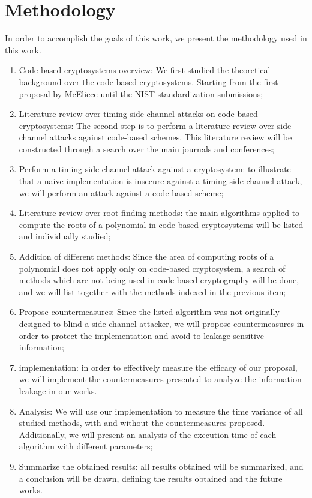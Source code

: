 \section{Methodology}
In order to accomplish the goals of this work, we present the methodology used in this work.
\begin{enumerate}
    \item Code-based cryptosystems overview: We first studied the theoretical background over the code-based cryptosystems. Starting from the first proposal by McEliece until the NIST standardization submissions;
    \item Literature review over timing side-channel attacks on code-based cryptosystems: The second step is to perform a literature review over side-channel attacks against code-based schemes. This literature review will be constructed through a search over the main journals and conferences;
    \item Perform a timing side-channel attack against a cryptosystem: to illustrate that a naive implementation is insecure against a timing side-channel attack, we will perform an attack against a code-based scheme;
    \item Literature review over root-finding methods: the main algorithms applied to compute the roots of a polynomial in code-based cryptosystems will be listed and individually studied; 
    \item Addition of different methods: Since the area of computing roots of a polynomial does not apply only on code-based cryptosystem, a search of methods which are not being used in code-based cryptography will be done, and we will list together with the methods indexed in the previous item;
    \item Propose countermeasures: Since the listed algorithm was not originally designed to blind a side-channel attacker, we will propose countermeasures in order to protect the implementation and avoid to leakage sensitive information;
    \item implementation: in order to effectively measure the efficacy of our proposal, we will implement the countermeasures presented to analyze the information leakage in our works.
    \item Analysis: We will use our implementation to measure the time variance of all studied methods, with and without the countermeasures proposed. Additionally, we will present an analysis of the execution time of each algorithm with different parameters;
    \item Summarize the obtained results: all results obtained will be summarized, and a conclusion will be drawn, defining the results obtained and the future works.
\end{enumerate}

